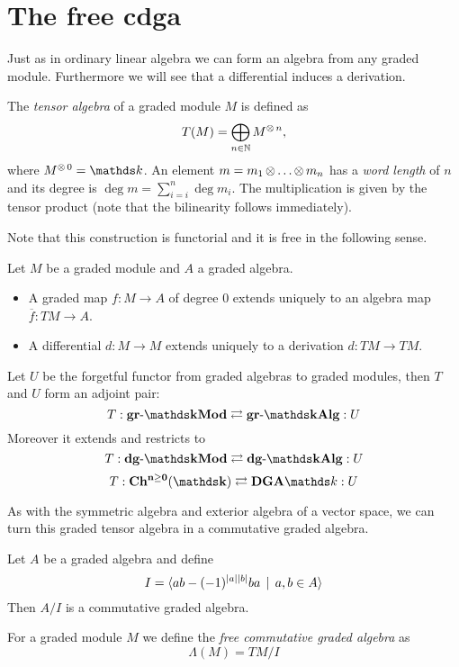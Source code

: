 
\section{The free cdga}
\label{sec:free-cdga}

Just as in ordinary linear algebra we can form an algebra from any graded module. Furthermore we will see that a differential induces a derivation.

\begin{definition}
	The \emph{tensor algebra} of a graded module $M$ is defined as
	$$ T(M) = \bigoplus_{n\in\mathbb{N}} M^{\operatorname*{\otimes} n}, $$
	where $M^{\tensor 0} = \k$. An element $m = m_1 \operatorname*{\otimes} \ldots \operatorname*{\otimes} m_n$ has a \emph{word length} of $n$ and its degree is $\deg{m} = \sum_{i=i}^n \deg{m_i}$. The multiplication is given by the tensor product (note that the bilinearity follows immediately).
\end{definition}

Note that this construction is functorial and it is free in the following sense.

\begin{lemma}
	Let $M$ be a graded module and $A$ a graded algebra.
	\begin{itemize}
		\item A graded map $f: M \to A$ of degree $0$ extends uniquely to an algebra map $\overline{f} : TM \to A$.
		\item A differential $d: M \to M$ extends uniquely to a derivation $d: TM \to TM$.
	\end{itemize}
\end{lemma}

\begin{corollary}
	Let $U$ be the forgetful functor from graded algebras to graded modules, then $T$ and $U$ form an adjoint pair:
	$$ T: \grMod{\k} \leftadj \grAlg{\k} :U $$
	Moreover it extends and restricts to
	$$ T: \dgMod{\k} \leftadj \dgAlg{\k} :U $$
	$$ T: \CoCh{\k} \leftadj \DGA{\k} :U $$
\end{corollary}

As with the symmetric algebra and exterior algebra of a vector space, we can turn this graded tensor algebra in a commutative graded algebra.

\begin{definition}
	Let $A$ be a graded algebra and define
	$$ I = \langle ab - (-1)^{{|{a}|}{|{b}|}}b a \,\mid\, a,b \in A \rangle $$
	Then $A / I$ is a commutative graded algebra.

	For a graded module $M$ we define the \emph{free commutative graded algebra} as
	$$ \Lambda(M) = TM / I $$
\end{definition}

